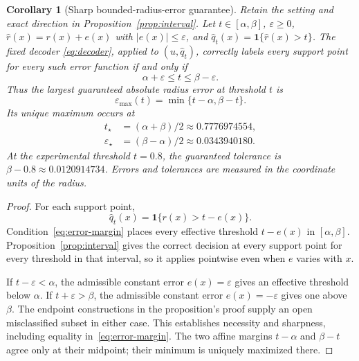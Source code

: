 \documentclass[11pt,a4paper]{article}
\newtheorem{corollary}{Corollary}
\numberwithin{equation}{section}
\begin{document}
\clearpage
\begin{corollary}[Sharp bounded-radius-error guarantee]\label{cor:radius-error}
Retain the setting and exact direction in Proposition~\ref{prop:interval}. Let $t\in[\alpha,\beta]$, $\varepsilon\geq0$, $\widehat r(x)=r(x)+e(x)$ with $|e(x)|\leq\varepsilon$, and $\widehat q_t(x)=\mathbf1\{\widehat r(x)>t\}$. The fixed decoder \eqref{eq:decoder}, applied to $(u,\widehat q_t)$, correctly labels every support point for every such error function if and only if
\begin{equation}
\alpha+\varepsilon\leq t\leq\beta-\varepsilon.
\label{eq:error-margin}
\end{equation}
Thus the largest guaranteed absolute radius error at threshold $t$ is
\begin{equation}
\varepsilon_{\max}(t)=\min\{t-\alpha,\beta-t\}.
\end{equation}
Its unique maximum occurs at
\begin{equation}
\begin{split}
t_\star&=(\alpha+\beta)/2\approx0.7776974554,\\
\varepsilon_\star&=(\beta-\alpha)/2\approx0.0343940180.
\end{split}
\end{equation}
At the experimental threshold $t=0.8$, the guaranteed tolerance is $\beta-0.8\approx0.0120914734$. Errors and tolerances are measured in the coordinate units of the radius.
\end{corollary}
\begin{proof}
For each support point,
\[
\widehat q_t(x)=\mathbf1\{r(x)>t-e(x)\}.
\]
Condition~\eqref{eq:error-margin} places every effective threshold $t-e(x)$ in $[\alpha,\beta]$. Proposition~\ref{prop:interval} gives the correct decision at every support point for every threshold in that interval, so it applies pointwise even when $e$ varies with $x$.

If $t-\varepsilon<\alpha$, the admissible constant error $e(x)=\varepsilon$ gives an effective threshold below $\alpha$. If $t+\varepsilon>\beta$, the admissible constant error $e(x)=-\varepsilon$ gives one above $\beta$. The endpoint constructions in the proposition's proof supply an open misclassified subset in either case. This establishes necessity and sharpness, including equality in~\eqref{eq:error-margin}. The two affine margins $t-\alpha$ and $\beta-t$ agree only at their midpoint; their minimum is uniquely maximized there.
\end{proof}
\end{document}
